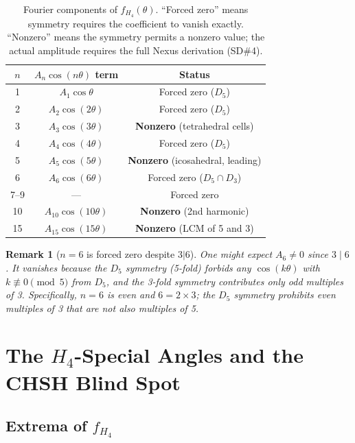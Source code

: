 \documentclass[11pt,letterpaper]{article}
\newtheorem{remark}[theorem]{Remark}
\begin{document}
\begin{table}[H]
\centering
\caption{Fourier components of $f_{H_4}(\theta)$.  ``Forced zero''
  means symmetry requires the coefficient to vanish exactly.
  ``Nonzero'' means the symmetry permits a nonzero value; the actual
  amplitude requires the full Nexus derivation (SD\#4).}
\label{tab:fourier}
\begin{tabular}{@{}ccc@{}}
\toprule
$n$ & $A_n\cos(n\theta)$ term & Status \\
\midrule
1 & $A_1\cos\theta$ & Forced zero ($D_5$) \\
2 & $A_2\cos(2\theta)$ & Forced zero ($D_5$) \\
3 & $A_3\cos(3\theta)$ & \textbf{Nonzero} (tetrahedral cells) \\
4 & $A_4\cos(4\theta)$ & Forced zero ($D_5$) \\
5 & $A_5\cos(5\theta)$ & \textbf{Nonzero} (icosahedral, leading) \\
6 & $A_6\cos(6\theta)$ & Forced zero ($D_5 \cap D_3$) \\
7--9 & --- & Forced zero \\
10 & $A_{10}\cos(10\theta)$ & \textbf{Nonzero} (2nd harmonic) \\
15 & $A_{15}\cos(15\theta)$ & \textbf{Nonzero} (LCM of 5 and 3) \\
\bottomrule
\end{tabular}
\end{table}

\begin{remark}[$n=6$ is forced zero despite $3|6$]
One might expect $A_6 \neq 0$ since $3\mid 6$.  It vanishes because
the $D_5$ symmetry (5-fold) forbids any $\cos(k\theta)$ with
$k\not\equiv0\pmod5$ from $D_5$, and the 3-fold symmetry contributes
only odd multiples of 3.  Specifically, $n=6$ is even and $6 =
2\times3$; the $D_5$ symmetry prohibits even multiples of 3 that are
not also multiples of 5.
\end{remark}

\section{The $H_4$-Special Angles and the CHSH Blind Spot}

\subsection{Extrema of $f_{H_4}$}
\end{document}
